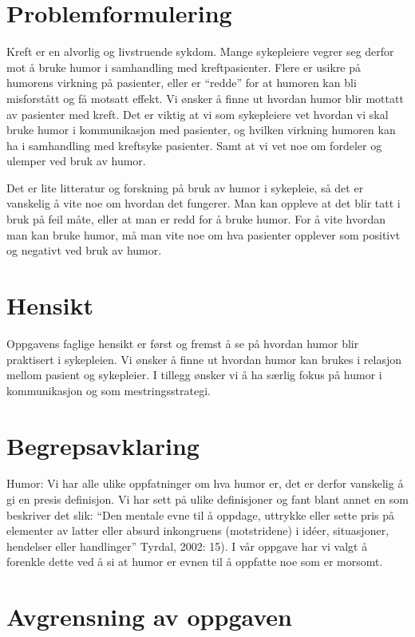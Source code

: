\section{Problemformulering}

Kreft er en alvorlig og livstruende sykdom. Mange sykepleiere vegrer seg derfor
mot å bruke humor i samhandling med kreftpasienter. Flere er usikre på humorens
virkning på pasienter, eller er “redde” for at humoren kan bli misforstått og
få motsatt effekt. Vi ønsker å finne ut hvordan humor blir mottatt av pasienter
med kreft. Det er viktig at vi som sykepleiere vet hvordan vi skal bruke humor
i kommunikasjon med pasienter, og hvilken virkning humoren kan ha i samhandling
med kreftsyke pasienter. Samt at vi vet noe om fordeler og ulemper ved bruk av
humor.

Det er lite litteratur og forskning på bruk av humor i sykepleie, så det er
vanskelig å vite noe om hvordan det fungerer. Man kan oppleve at det blir tatt
i bruk på feil måte, eller at man er redd for å bruke humor. For å vite hvordan
man kan bruke humor, må man vite noe om hva pasienter opplever som positivt og
negativt ved bruk av humor.

\section{Hensikt}

Oppgavens faglige hensikt er først og fremst å se på hvordan humor blir
praktisert i sykepleien. Vi ønsker å finne ut hvordan humor kan brukes i
relasjon mellom pasient og sykepleier. I tillegg ønsker vi å ha særlig fokus på
humor i kommunikasjon og som mestringsstrategi.

\section{Begrepsavklaring}

Humor:
Vi har alle ulike oppfatninger om hva humor er, det er derfor vanskelig å gi en presis definisjon. Vi har sett på ulike definisjoner og fant blant annet en som beskriver det slik: “Den mentale evne til å oppdage, uttrykke eller sette pris på elementer av latter eller absurd inkongruens (motstridene) i idéer, situasjoner, hendelser eller handlinger” Tyrdal, 2002: 15). I vår oppgave har vi valgt å forenkle dette ved å si at humor er evnen til å oppfatte noe som er morsomt.

\section{Avgrensning av oppgaven}

